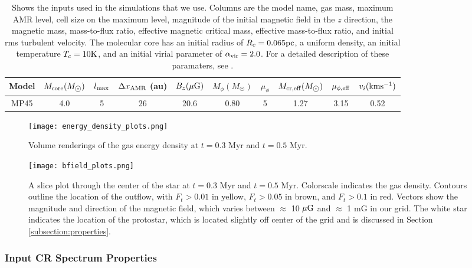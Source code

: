\documentclass[twocolumn]{aastex63}
\begin{document}
\begin{table*} 
\centering
\begin{tabular}{ |c c c c c c c c c c| } 
\hline
 Model & $M_{\rm core} (M_{\astrosun})$ & $l_{\rm max}$ & $\Delta x_{\rm AMR}$ (au) & $B_z (\mu \rm G)$ & $M_{\phi} (M_{\astrosun})$ & $\mu_{\phi}$ & $M_{\rm cr, eff} (M_{\astrosun})$ & $\mu_{\phi, \rm eff}$ & $v_i \rm (km  s^{-1})$\\
 \hline
MP45 & 4.0 & 5 & 26 & 20.6 & 0.80 & 5 & 1.27 & 3.15 & 0.52 \\
 \hline
\end{tabular}
\caption{Shows the inputs used in the \cite{offner_2017_impact} simulations that we use. Columns are the model name, gas mass, maximum AMR level, cell size on the maximum level, magnitude of the initial magnetic field in the $z$ direction, the magnetic mass, mass-to-flux ratio, effective magnetic critical mass, effective mass-to-flux ratio, and initial rms turbulent velocity. The molecular core has an initial radius of $R_c = 0.065 \rm pc$, a uniform density, an initial temperature $T_c = 10 \rm K$, and an initial virial parameter of $\alpha_{\rm vir}=2.0$. For a detailed description of these paramaters, see \cite{offner_2017_impact}.}
\label{table:offner_initial_conditions}
\end{table*}

\begin{figure*}[th!]
\centering
\texttt{[image: energy\_density\_plots.png]}
\caption{Volume renderings of the gas energy density at $t=0.3$ Myr and $t=0.5$ Myr.}
\label{fig:gas_density}
\end{figure*}

\begin{figure*}[th!]
\centering
\texttt{[image: bfield\_plots.png]}
\caption{A slice plot through the center of the star at $t=0.3$ Myr and $t=0.5$ Myr. Colorscale indicates the gas density. Contours outline the location of the outflow, with $F_t > 0.01$ in yellow, $F_t > 0.05$ in brown, and $F_t > 0.1$ in red. Vectors show the magnitude and direction of the magnetic field, which varies between $\approx$ 10 $\mu \rm G$ and $\approx$ 1 mG in our grid. The white star indicates the location of the protostar, which is located slightly off center of the grid and is discussed in Section \ref{subsection:properties}.}
\label{fig:bfield}
\end{figure*}

\subsubsection{Input CR Spectrum Properties}
\label{subsubsection:spectrum}
\end{document}
